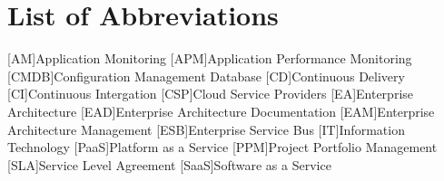 
\chapter*{List of Abbreviations}

\begin{acronym}[ewuifbwejkbfjksbjkcbsdjcjkn3j]%
[AM]{Application Monitoring}
[APM]{Application Performance Monitoring}
[CMDB]{Configuration Management Database}
[CD]{Continuous Delivery}
[CI]{Continuous Intergation}
[CSP]{Cloud Service Providers}
[EA]{Enterprise Architecture}
[EAD]{Enterprise Architecture Documentation}
[EAM]{Enterprise Architecture Management}
[ESB]{Enterprise Service Bus}
[IT]{Information Technology}
[PaaS]{Platform as a Service}
[PPM]{Project Portfolio Management}
[SLA]{Service Level Agreement}
[SaaS]{Software as a Service}

%


\end{acronym}